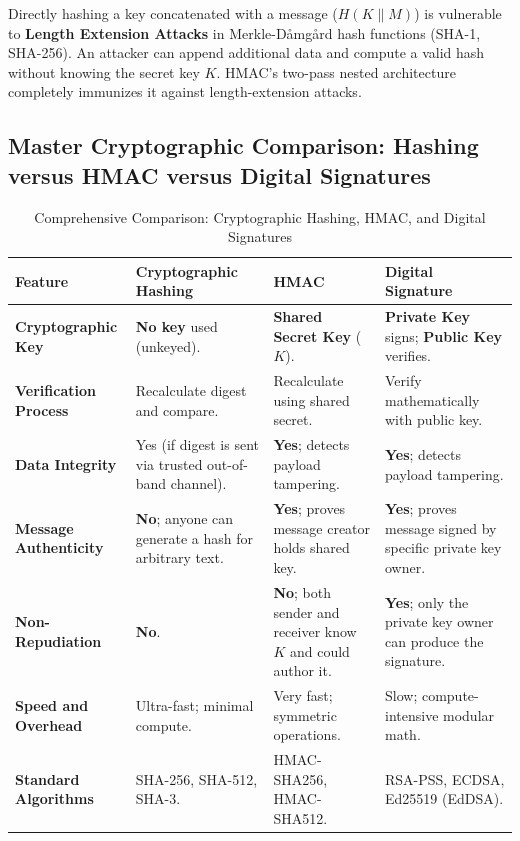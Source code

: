 \begin{tcolorbox}[colback=yellow!10!white,colframe=yellow!60!black,title=\textbf{Examination Rule: Why Double Hashing in HMAC?}]
Directly hashing a key concatenated with a message ($H(K \| M)$) is vulnerable to \textbf{Length Extension Attacks} in Merkle-D\aa mg\aa rd hash functions (SHA-1, SHA-256). An attacker can append additional data and compute a valid hash without knowing the secret key $K$. HMAC's two-pass nested architecture completely immunizes it against length-extension attacks.
\end{tcolorbox}

\subsection{Master Cryptographic Comparison: Hashing versus HMAC versus Digital Signatures}

\begin{table}[htbp]
\centering
\caption{Comprehensive Comparison: Cryptographic Hashing, HMAC, and Digital Signatures}
\label{tab:hashing_vs_hmac_vs_signature}
\begin{tabularx}{\textwidth}{p{3.2cm} X X X}
\toprule
\textbf{Feature} & \textbf{Cryptographic Hashing} & \textbf{HMAC} & \textbf{Digital Signature} \\
\midrule
\textbf{Cryptographic Key} & \textbf{No key} used (unkeyed). & \textbf{Shared Secret Key} ($K$). & \textbf{Private Key} signs; \textbf{Public Key} verifies. \\
\textbf{Verification Process} & Recalculate digest and compare. & Recalculate using shared secret. & Verify mathematically with public key. \\
\textbf{Data Integrity} & Yes (if digest is sent via trusted out-of-band channel). & \textbf{Yes}; detects payload tampering. & \textbf{Yes}; detects payload tampering. \\
\textbf{Message Authenticity} & \textbf{No}; anyone can generate a hash for arbitrary text. & \textbf{Yes}; proves message creator holds shared key. & \textbf{Yes}; proves message signed by specific private key owner. \\
\textbf{Non-Repudiation} & \textbf{No}. & \textbf{No}; both sender and receiver know $K$ and could author it. & \textbf{Yes}; only the private key owner can produce the signature. \\
\textbf{Speed and Overhead} & Ultra-fast; minimal compute. & Very fast; symmetric operations. & Slow; compute-intensive modular math. \\
\textbf{Standard Algorithms} & SHA-256, SHA-512, SHA-3. & HMAC-SHA256, HMAC-SHA512. & RSA-PSS, ECDSA, Ed25519 (EdDSA). \\
\bottomrule
\end{tabularx}
\end{table}

